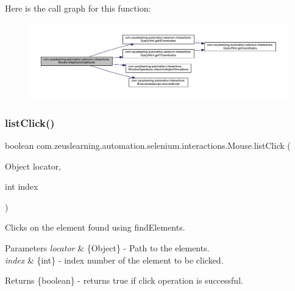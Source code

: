 Here is the call graph for this function\+:
\nopagebreak
\begin{figure}[H]
\begin{center}
\leavevmode
\includegraphics[width=350pt]{d0/dfa/classcom_1_1zeuslearning_1_1automation_1_1selenium_1_1interactions_1_1Mouse_a82e9cde3b736af28bad478dbf2d69889_cgraph}
\end{center}
\end{figure}
\hypertarget{classcom_1_1zeuslearning_1_1automation_1_1selenium_1_1interactions_1_1Mouse_ae7d7e20e0aa4c531d441da986d4fa3f0}{}\label{classcom_1_1zeuslearning_1_1automation_1_1selenium_1_1interactions_1_1Mouse_ae7d7e20e0aa4c531d441da986d4fa3f0} 
\subsubsection{\texorpdfstring{list\+Click()}{listClick()}}
{\footnotesize\ttfamily boolean com.\+zeuslearning.\+automation.\+selenium.\+interactions.\+Mouse.\+list\+Click (\begin{DoxyParamCaption}\item[{Object}]{locator,  }\item[{int}]{index }\end{DoxyParamCaption})\hspace{0.3cm}{\ttfamily [inline]}}

Clicks on the element found using find\+Elements.


\begin{DoxyParams}{Parameters}
{\em locator} & \{Object\} -\/ Path to the elements. \\
\hline
{\em index} & \{int\} -\/ index number of the element to be clicked.\\
\hline
\end{DoxyParams}
\begin{DoxyReturn}{Returns}
\{boolean\} -\/ returns {\ttfamily true} if click operation is successful. 
\end{DoxyReturn}


